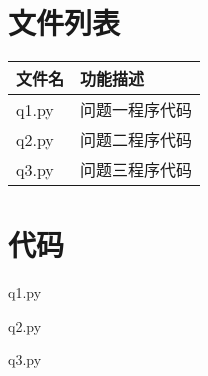 \documentclass[withoutpreface,bwprint]{cumcmthesis}
\begin{document}
\newpage
\begin{appendices}
\section{文件列表}
\begin{table}[H]
\centering
\begin{tabularx}{\textwidth}{LL}
\toprule
文件名   & 功能描述 \\
\midrule
q1.py & 问题一程序代码 \\
q2.py & 问题二程序代码 \\
q3.py & 问题三程序代码 \\
\bottomrule
\end{tabularx}
\label{tab:文件列表}
\end{table}

\section{代码}
\noindent q1.py

q2.py

q3.py

\end{appendices}
\end{document}
